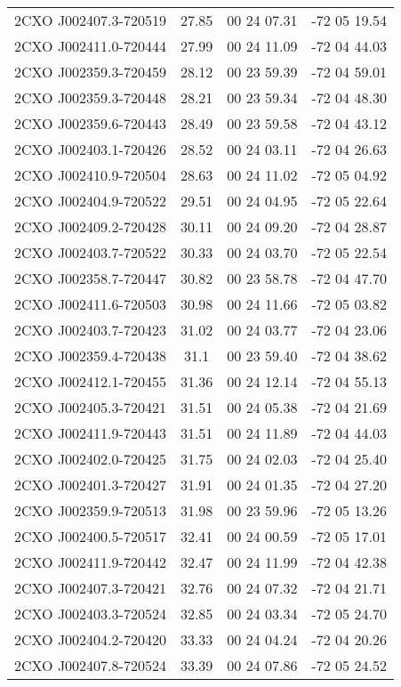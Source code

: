 \begin{table}
\begin{tabular}{cccc}
2CXO J002407.3-720519 & 27.85 & 00 24 07.31 & -72 05 19.54 \\
2CXO J002411.0-720444 & 27.99 & 00 24 11.09 & -72 04 44.03 \\
2CXO J002359.3-720459 & 28.12 & 00 23 59.39 & -72 04 59.01 \\
2CXO J002359.3-720448 & 28.21 & 00 23 59.34 & -72 04 48.30 \\
2CXO J002359.6-720443 & 28.49 & 00 23 59.58 & -72 04 43.12 \\
2CXO J002403.1-720426 & 28.52 & 00 24 03.11 & -72 04 26.63 \\
2CXO J002410.9-720504 & 28.63 & 00 24 11.02 & -72 05 04.92 \\
2CXO J002404.9-720522 & 29.51 & 00 24 04.95 & -72 05 22.64 \\
2CXO J002409.2-720428 & 30.11 & 00 24 09.20 & -72 04 28.87 \\
2CXO J002403.7-720522 & 30.33 & 00 24 03.70 & -72 05 22.54 \\
2CXO J002358.7-720447 & 30.82 & 00 23 58.78 & -72 04 47.70 \\
2CXO J002411.6-720503 & 30.98 & 00 24 11.66 & -72 05 03.82 \\
2CXO J002403.7-720423 & 31.02 & 00 24 03.77 & -72 04 23.06 \\
2CXO J002359.4-720438 & 31.1 & 00 23 59.40 & -72 04 38.62 \\
2CXO J002412.1-720455 & 31.36 & 00 24 12.14 & -72 04 55.13 \\
2CXO J002405.3-720421 & 31.51 & 00 24 05.38 & -72 04 21.69 \\
2CXO J002411.9-720443 & 31.51 & 00 24 11.89 & -72 04 44.03 \\
2CXO J002402.0-720425 & 31.75 & 00 24 02.03 & -72 04 25.40 \\
2CXO J002401.3-720427 & 31.91 & 00 24 01.35 & -72 04 27.20 \\
2CXO J002359.9-720513 & 31.98 & 00 23 59.96 & -72 05 13.26 \\
2CXO J002400.5-720517 & 32.41 & 00 24 00.59 & -72 05 17.01 \\
2CXO J002411.9-720442 & 32.47 & 00 24 11.99 & -72 04 42.38 \\
2CXO J002407.3-720421 & 32.76 & 00 24 07.32 & -72 04 21.71 \\
2CXO J002403.3-720524 & 32.85 & 00 24 03.34 & -72 05 24.70 \\
2CXO J002404.2-720420 & 33.33 & 00 24 04.24 & -72 04 20.26 \\
2CXO J002407.8-720524 & 33.39 & 00 24 07.86 & -72 05 24.52 \\

\end{tabular}
\end{table}
